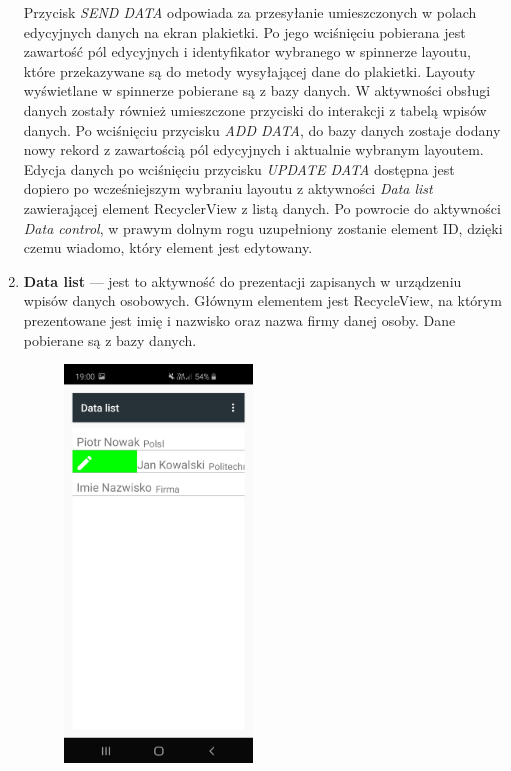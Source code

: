 \documentclass[a4paper,12pt, twoside]{article}
\begin{document}
\begin{enumerate}
\begin{figure}[H]
\begin{minipage}{.5\textwidth}
                    \label{fig:dataEdit}
                \end{minipage}
    	   \end{figure}
    	   Przycisk \textit{SEND DATA} odpowiada za przesyłanie umieszczonych w polach edycyjnych danych na ekran plakietki. Po jego wciśnięciu pobierana jest zawartość pól edycyjnych i identyfikator wybranego w spinnerze layoutu, które przekazywane są do metody wysyłającej dane do plakietki. Layouty wyświetlane w spinnerze pobierane są z bazy danych. W aktywności obsługi danych zostały również umieszczone przyciski do interakcji z tabelą wpisów danych. Po wciśnięciu przycisku \textit{ADD DATA}, do bazy danych zostaje dodany nowy rekord z zawartością pól edycyjnych i aktualnie wybranym layoutem. Edycja danych po wciśnięciu przycisku \textit{UPDATE DATA} dostępna jest dopiero po wcześniejszym wybraniu layoutu z aktywności \textit{Data list} zawierającej element RecyclerView z listą danych. Po powrocie do aktywności \textit{Data control}, w prawym dolnym rogu uzupełniony zostanie element ID, dzięki czemu wiadomo, który element jest edytowany.
    	   \item \textbf{Data list} — jest to aktywność do prezentacji zapisanych w urządzeniu wpisów danych osobowych. Głównym elementem jest RecycleView, na którym prezentowane jest imię i nazwisko oraz nazwa firmy danej osoby. Dane pobierane są z bazy danych.  
    	   \begin{figure}[H]
    	        \centering
    	        \begin{minipage}{.5\textwidth}
                    \centering
    	            \includegraphics[width=5cm]{images/view_dataList.jpg}

\end{minipage}
\end{figure}
\end{enumerate}
\end{document}
